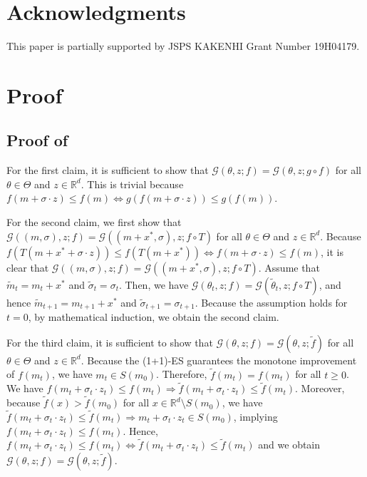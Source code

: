 \documentclass[journal]{IEEEtran}
\providecommand{\R}{\mathbb{R}} %
\renewcommand{\geq}{\geqslant} %
\renewcommand{\leq}{\leqslant} %
\theoremstyle{definition}
\begin{document}
\section*{Acknowledgments}
This paper is partially supported by JSPS KAKENHI Grant Number 19H04179.



\appendix

\section{Proof}

\subsection{Proof of }\label{apdx:prop:invariance}

For the first claim, it is sufficient to show that $\mathcal{G}(\theta, z; f) = \mathcal{G}(\theta, z; g \circ f)$ for all $\theta \in \Theta$ and $z \in \R^d$. This is trivial because $f(m + \sigma \cdot z) \leq f(m) \Leftrightarrow g(f(m + \sigma \cdot z)) \leq g(f(m))$.

For the second claim, we first show that $\mathcal{G}((m, \sigma), z; f) = \mathcal{G}((m+x^*, \sigma), z; f \circ T)$ for all $\theta \in \Theta$ and $z \in \R^d$. Because $f(T(m + x^* + \sigma \cdot z)) \leq f(T(m + x^*)) \Leftrightarrow f(m + \sigma \cdot z) \leq f(m)$, it is clear that $\mathcal{G}((m, \sigma), z; f) = \mathcal{G}((m+x^*, \sigma), z; f \circ T)$. Assume that $\tilde{m}_{t} = m_t + x^*$ and $\tilde{\sigma}_t = \sigma_t$. Then, we have $\mathcal{G}(\theta_t, z; f) = \mathcal{G}(\tilde{\theta}_t, z; f \circ T)$, and hence $\tilde{m}_{t+1} = m_{t+1} + x^*$ and $\tilde{\sigma}_{t+1} = \sigma_{t+1}$. Because the assumption holds for $t = 0$, by mathematical induction, we obtain the second claim.

For the third claim, it is sufficient to show that $\mathcal{G}(\theta, z; f) = \mathcal{G}(\theta, z; \tilde{f})$ for all $\theta \in \Theta$ and $z \in \R^d$. Because the (1+1)-ES guarantees the monotone improvement of $f(m_t)$, we have $m_t \in S(m_0)$. Therefore, $\tilde{f}(m_t) = f(m_t)$ for all $t \geq 0$. We have $f(m_t + \sigma_t \cdot z_t) \leq f(m_t) \Rightarrow \tilde{f}(m_t + \sigma_t \cdot z_t) \leq \tilde{f}(m_t)$. Moreover, because $\tilde{f}(x) > \tilde{f}(m_0)$ for all $x \in \R^d\setminus S(m_0)$, we have $\tilde{f}(m_t + \sigma_t \cdot z_t) \leq \tilde{f}(m_t) \Rightarrow m_t + \sigma_t \cdot z_t \in S(m_0)$, implying $f(m_t + \sigma_t \cdot z_t) \leq f(m_t)$. Hence, $f(m_t + \sigma_t \cdot z_t) \leq f(m_t) \Leftrightarrow \tilde{f}(m_t + \sigma_t \cdot z_t) \leq \tilde{f}(m_t)$ and we obtain $\mathcal{G}(\theta, z; f) = \mathcal{G}(\theta, z; \tilde{f})$.
\end{document}

